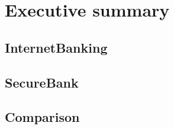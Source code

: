 \chapter{Executive summary}
\section*{InternetBanking}

\section*{SecureBank}

\section*{Comparison}